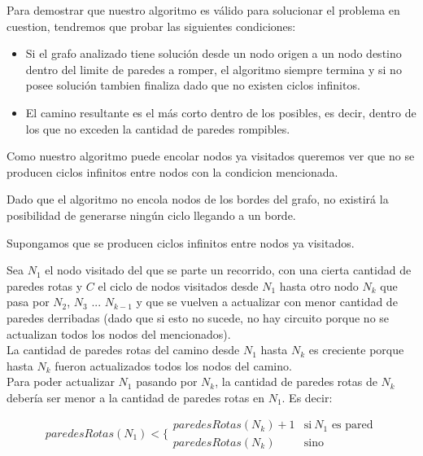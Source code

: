 Para demostrar que nuestro algoritmo es válido para solucionar el problema en cuestion, tendremos que probar las siguientes condiciones:\\

\begin{itemize}
\item Si el grafo analizado tiene solución desde un nodo origen a un nodo destino dentro del limite de paredes a romper, el algoritmo siempre termina y si no posee solución tambien finaliza dado que no existen ciclos infinitos.
\item El camino resultante es el m\'as corto dentro de los posibles, es decir, dentro de los que no exceden la cantidad de paredes rompibles.
\end{itemize}

Como nuestro algoritmo puede encolar nodos ya visitados queremos ver que no se producen ciclos infinitos entre nodos con la condicion mencionada.

Dado que el algoritmo no encola nodos de los bordes del grafo, no existirá la posibilidad de generarse ningún ciclo llegando a un borde.

Supongamos que se producen ciclos infinitos entre nodos ya visitados. 

Sea $N_1$ el nodo visitado del que se parte un recorrido, con una cierta cantidad de paredes rotas y $C$ el ciclo de nodos visitados desde $N_1$ hasta otro nodo  $N_k$  que pasa por $N_2$, $N_3$ ... $N_{k-1}$ y que se vuelven a actualizar con menor cantidad de paredes derribadas (dado que si esto no sucede, no hay circuito porque no se actualizan todos los nodos del mencionados).\\
 
La cantidad de paredes rotas del camino desde $N_1$ hasta $N_k$ es creciente porque hasta $N_k$ fueron actualizados todos los nodos del camino.\\

Para poder actualizar $N_1$ pasando por $N_k$, la cantidad de paredes rotas de $N_k$ debería ser menor a la cantidad de paredes rotas en $N_1$. Es decir:

\begin{equation}
paredesRotas(N_1) <
\Bigg \{
\begin{matrix} 
paredesRotas(N_k) + 1 & \mathrm{si\ } N_1 \text{$\text{ es pared}$} \\
paredesRotas(N_k)  & \mathrm{si no\ }
\end{matrix}
\end{equation}

